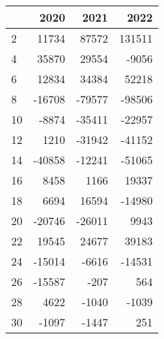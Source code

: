 \begin{tabular}{lrrr}
\toprule
{} &   2020 &   2021 &    2022 \\
\midrule
2  &  11734 &  87572 &  131511 \\
4  &  35870 &  29554 &   -9056 \\
6  &  12834 &  34384 &   52218 \\
8  & -16708 & -79577 &  -98506 \\
10 &  -8874 & -35411 &  -22957 \\
12 &   1210 & -31942 &  -41152 \\
14 & -40858 & -12241 &  -51065 \\
16 &   8458 &   1166 &   19337 \\
18 &   6694 &  16594 &  -14980 \\
20 & -20746 & -26011 &    9943 \\
22 &  19545 &  24677 &   39183 \\
24 & -15014 &  -6616 &  -14531 \\
26 & -15587 &   -207 &     564 \\
28 &   4622 &  -1040 &   -1039 \\
30 &  -1097 &  -1447 &     251 \\
\bottomrule
\end{tabular}
